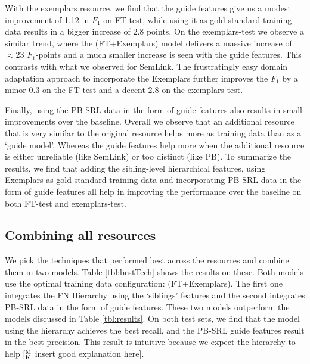 \documentclass[11pt,a4paper]{article}
\newcommand{\ensuretext}[1]{#1}
\newcommand{\mkmarker}{\ensuretext{\textcolor{mdgreen}{\ensuremath{^{\textsc{M}}_{\textsc{K}}}}}}
\newcommand{\arkcomment}[3]{\ensuretext{\textcolor{#3}{[#1 #2]}}}
\newcommand{\mk}[1]{\arkcomment{\mkmarker}{#1}{mdgreen}}
\begin{document}
With the exemplars resource, we find that the guide features give us a modest improvement of 1.12 in $F_1$ on FT-test, 
while using it as gold-standard training data results in a bigger increase of 2.8 points. 
On the exemplars-test we observe a similar trend, where the (FT+Exemplars) model delivers a massive increase of $\approx$23 $F_1$-points and a 
much smaller increase is seen with the guide features. This contrasts with what we observed for SemLink.
The frustratingly easy domain adaptation approach to incorporate the Exemplars
further improves the $F_1$ by a minor 0.3 on the FT-test and a decent 2.8 on the exemplars-test.

Finally, using the PB-SRL data in the form of guide features also results in small improvements over the baseline. 
Overall we observe that an additional resource that is very similar to the original resource helps more as training data than as a `guide model'.
Whereas the guide features help more when the additional resource is either unreliable (like SemLink) or too distinct (like PB). 
To summarize the results, we find that adding the sibling-level hierarchical features, using Exemplars as gold-standard training data and 
incorporating PB-SRL data in the form of guide features all help in improving the performance over the baseline on both FT-test and exemplars-test.
 
\subsection{Combining all resources}

We pick the techniques that performed best across the resources and combine them in two models. Table \ref{tbl:bestTech} shows the results on these.
Both models use the optimal training data configuration: (FT+Exemplars). The first one integrates the FN Hierarchy using the `siblings' features
and the second integrates PB-SRL data in the form of guide features. These two models outperform the models discussed in Table \ref{tbl:results}.
On both test sets, we find that the model using the hierarchy achieves the best recall, and the PB-SRL guide features result in the 
best precision. This result is intuitive because we expect the hierarchy to help \mk{insert good explanation here}.
\end{document}
